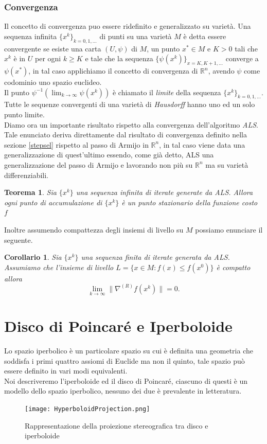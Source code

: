 \documentclass[a4paper, 12pt]{article}
\newtheorem{theorem}{Teorema}
\newtheorem{corollary}{Corollario}
\begin{document}
\subsubsection{Convergenza}
Il concetto di convergenza puo essere ridefinito e generalizzato su varietà. Una sequenza infinita $\{x^k\}_{k=0,1,...}$ di punti su una varietà $M$ è detta essere convergente se esiste una carta $(U, \psi)$ di $M$, un punto $x^\ast \in M$ e $K > 0$ tali che $x^k$ è in $U$ per ogni $k \geq K$ e tale che la sequenza $\{\psi(x^k)\}_{x=K, K+1, ...}$ converge a $\psi(x^\ast)$, in tal caso applichiamo il concetto di convergenza di $\mathbb{R}^n$, avendo $\psi$ come codominio uno spazio euclideo.\\
Il punto $\psi^{-1}(\lim_{k \to \infty} \psi(x^k))$ è chiamato il \emph{limite} della sequenza $\{x^k\}_{k=0,1,...}$.\\
Tutte le sequenze convergenti di una varietà di \emph{Hausdorff} hanno uno ed un solo punto limite.\\
Diamo ora un importante risultato rispetto alla convergenza dell'algoritmo \emph{ALS}.\\
Tale enunciato deriva direttamente dal risultato di convergenza definito nella sezione \ref{stepsel} rispetto al passo di Armijo in $\mathbb{R}^n$, in tal caso viene data una generalizzazione di quest'ultimo essendo, come già detto, ALS una generalizzazione del passo di Armijo e lavorando non più su $\mathbb{R}^n$ ma su varietà differenziabili.
\begin{theorem}
Sia $\{x^k\}$ una sequenza infinita di iterate generate da ALS. Allora ogni punto di accumulazione  di $\{x^k\}$ è un punto stazionario della funzione costo $f$
\end{theorem}
Inoltre assumendo compattezza degli insiemi di livello su $M$ possiamo enunciare il seguente.
\begin{corollary}
Sia $\{x^k\}$ una sequenza finita di iterate generata da ALS. Assumiamo che l'insieme di livello $L = \{x \in M : f(x) \leq f(x^0)\}$ è compatto allora\\
\[\lim_{k \to \infty} \| \nabla^{(R)} f(x^k) \| = 0.\]
\end{corollary}

\section{Disco di Poincaré e Iperboloide}
Lo spazio iperbolico è un particolare spazio su cui è definita una geometria che soddisfa i primi quattro assiomi di Euclide ma non il quinto, tale spazio può essere definito in vari modi equivalenti.\\
Noi descriveremo l'iperboloide ed il disco di Poincaré, ciascuno di questi è un modello dello spazio iperbolico, nessuno dei due è prevalente in letteratura.\\
\begin{figure}[t] %
    \centering\texttt{[image: HyperboloidProjection.png]}
    \caption{Rappresentazione della proiezione stereografica tra disco e iperboloide}
\end{figure}
\end{document}
